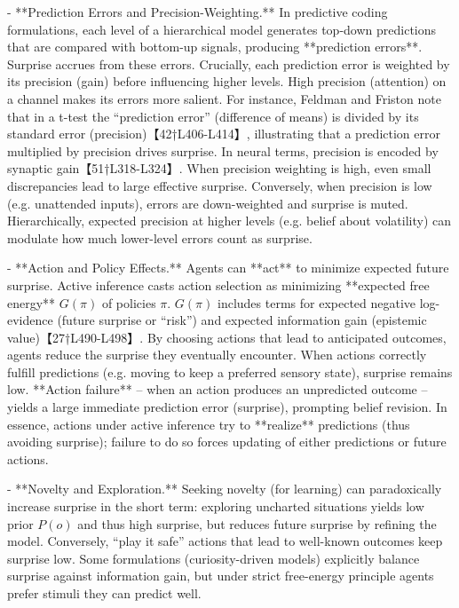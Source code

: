 \documentclass[a4paper]{article}
\begin{document}
    - **Prediction Errors and Precision-Weighting.**  In predictive coding formulations, each level of a hierarchical model generates top-down predictions that are compared with bottom-up signals, producing **prediction errors**.  Surprise accrues from these errors. Crucially, each prediction error is weighted by its precision (gain) before influencing higher levels.  High precision (attention) on a channel makes its errors more salient.  For instance, Feldman and Friston note that in a t-test the “prediction error” (difference of means) is divided by its standard error (precision)【42†L406-L414】, illustrating that a prediction error multiplied by precision drives surprise.  In neural terms, precision is encoded by synaptic gain【51†L318-L324】.  When precision weighting is high, even small discrepancies lead to large effective surprise.  Conversely, when precision is low (e.g. unattended inputs), errors are down-weighted and surprise is muted.  Hierarchically, expected precision at higher levels (e.g. belief about volatility) can modulate how much lower-level errors count as surprise.
    
    - **Action and Policy Effects.**  Agents can **act** to minimize expected future surprise.  Active inference casts action selection as minimizing **expected free energy** \(G(\pi)\) of policies \(\pi\).  \(G(\pi)\) includes terms for expected negative log-evidence (future surprise or “risk”) and expected information gain (epistemic value)【27†L490-L498】.  By choosing actions that lead to anticipated outcomes, agents reduce the surprise they eventually encounter.  When actions correctly fulfill predictions (e.g. moving to keep a preferred sensory state), surprise remains low.  **Action failure** – when an action produces an unpredicted outcome – yields a large immediate prediction error (surprise), prompting belief revision.  In essence, actions under active inference try to **realize** predictions (thus avoiding surprise); failure to do so forces updating of either predictions or future actions.
    
    - **Novelty and Exploration.**  Seeking novelty (for learning) can paradoxically increase surprise in the short term: exploring uncharted situations yields low prior \(P(o)\) and thus high surprise, but reduces future surprise by refining the model.  Conversely, “play it safe” actions that lead to well-known outcomes keep surprise low.  Some formulations (curiosity-driven models) explicitly balance surprise against information gain, but under strict free-energy principle agents prefer stimuli they can predict well.
    
\end{document}
